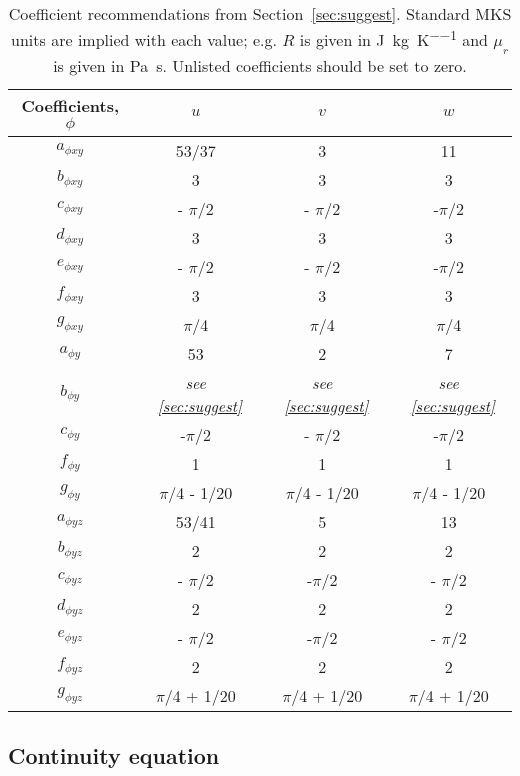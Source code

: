 \documentclass[10pt]{article}
\begin{document}
\begin{landscape}
\begin{table}[ht]
\begin{center} \label{tbl:auxcoeff}
\caption{Coefficient recommendations from Section~\ref{sec:suggest}.
         Standard MKS units are implied with each value; e.g.
         $R$ is given in
         \si{\joule\per\kilo\gram\per\kelvin} and $\mu_r$ is given in
         \si{\pascal\second}.
         Unlisted coefficients should be set to zero.
        }
\begin{tabular}[t]{c c c c}
\toprule
Coefficients, $\phi$ 		& $u$ 	& $v$    	& $w$ \\ [0.5ex] 
\midrule\midrule
$a_{\phi xy}$ & 53/37	& 3 		& 11\\
$b_{\phi xy}$ & 3	& 3 		& 3\\
$c_{\phi xy}$ & - $\pi$/2	& - $\pi$/2	& -$\pi$/2 \\
$d_{\phi xy}$ & 3	& 3         	& 3\\
$e_{\phi xy}$ & - $\pi$/2	& - $\pi$/2 	& -$\pi$/2\\
$f_{\phi xy}$ & 3	& 3 		& 3\\
$g_{\phi xy}$ & $\pi$/4	& $\pi$/4 	& $\pi$/4 \\
$a_{\phi y}$ & 53	& 2 		& 7 \\
$b_{\phi y}$ & \emph{see \textsection{}~\ref{sec:suggest}}& \emph{see \textsection{}~\ref{sec:suggest}} &\emph{see \textsection{}~\ref{sec:suggest}} \\
$c_{\phi y}$ & -$\pi$/2	& - $\pi$/2 	& -$\pi$/2 \\
$f_{\phi y}$ & 1	& 1 		& 1 \\
$g_{\phi y}$ & $\pi$/4 - 1/20	& $\pi$/4 - 1/20  & $\pi$/4 - 1/20 \\
$a_{\phi yz}$ & 53/41	& 5 		& 13 \\
$b_{\phi yz}$ & 2	& 2 		& 2 \\
$c_{\phi yz}$ & - $\pi$/2	& -$\pi$/2 	& - $\pi$/2 \\
$d_{\phi yz}$ & 2	& 2 		& 2 \\
$e_{\phi yz}$ & - $\pi$/2	& -$\pi$/2	& - $\pi$/2 \\
$f_{\phi yz}$ & 2	& 2 		& 2 \\
$g_{\phi yz}$ & $\pi$/4 + 1/20	& $\pi$/4 + 1/20 & $\pi$/4 + 1/20 \\
\bottomrule
\end{tabular}
\end{center}
\end{table}



\subsection{Continuity equation}


\end{landscape}
\end{document}
